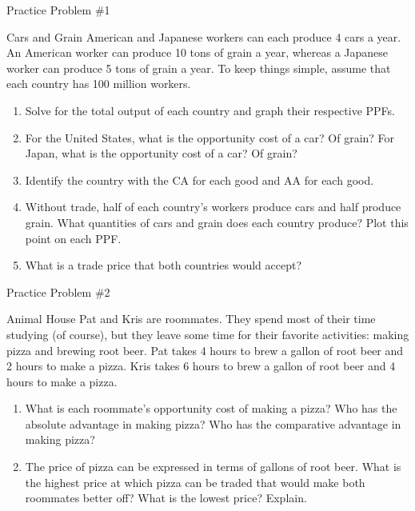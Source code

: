 \documentclass[aspectratio=169]{beamer}
\begin{document}
\begin{frame}{Practice Problem \#1}
    \begin{block}{Cars and Grain}
        American and Japanese workers can each produce 4 cars a year. An American worker can produce 10 tons of grain a year, whereas a Japanese worker can produce 5 tons of grain a year. To keep things simple, assume that each country has 100 million workers.
        \begin{enumerate}
            \item Solve for the total output of each country and graph their respective PPFs.
            \item For the United States, what is the opportunity cost of a car? Of grain? For Japan, what is the opportunity cost of a car? Of grain?
            \item Identify the country with the CA for each good and AA for each good.
            \item Without trade, half of each country’s workers produce cars and half produce grain. What quantities of cars and grain does each country produce? Plot this point on each PPF.
            \item What is a trade price that both countries would accept?
        \end{enumerate}
    \end{block}
\end{frame}

\begin{frame}{Practice Problem \#2}
    \begin{block}{Animal House}
        Pat and Kris are roommates. They spend most of their time studying (of course), but they leave some time for their favorite activities: making pizza and brewing root beer. Pat takes 4 hours to brew a gallon of root beer and 2 hours to make a pizza. Kris takes 6 hours to brew a gallon of root beer and 4 hours to make a pizza. 
        \begin{enumerate}
            \item What is each roommate’s opportunity cost of making a pizza? Who has the absolute advantage in making pizza? Who has the comparative advantage in making pizza?
            \item The price of pizza can be expressed in terms of gallons of root beer. What is the highest price at which pizza can be traded that would make both roommates better off? What is the lowest price? Explain. 
        \end{enumerate}
    \end{block}
\end{frame}
\end{document}
